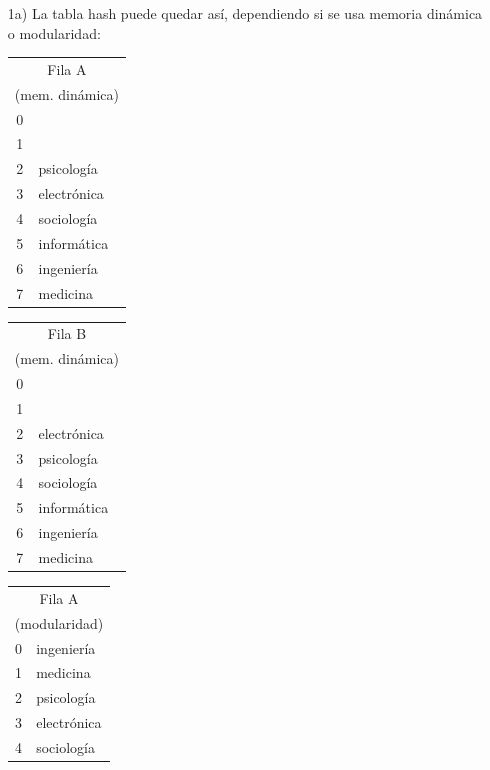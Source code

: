 \documentclass[letter,12pt,oneside]{book}
\theoremstyle{definition}
\begin{document}
\begin{enumerate}
    \item[1a)] La tabla hash puede quedar así, dependiendo si se usa memoria dinámica o modularidad:
    
    \begin{tabular}{|c|l|}
    \multicolumn{2}{c}{Fila A}\\
    \multicolumn{2}{c}{(mem. dinámica)}\\\hline
        0 &  \\\hline
        1 &  \\\hline
        2 & psicología \\\hline
        3 & electrónica\\\hline
        4 & sociología \\\hline
        5 & informática\\\hline
        6 & ingeniería \\\hline
        7 & medicina   \\\hline
    \end{tabular}
    \hspace{2ex}
    \begin{tabular}{|c|l|}
    \multicolumn{2}{c}{Fila B}\\
    \multicolumn{2}{c}{(mem. dinámica)}\\\hline
        0 &  \\\hline
        1 &  \\\hline
        2 & electrónica\\\hline
        3 & psicología \\\hline
        4 & sociología \\\hline
        5 & informática\\\hline
        6 & ingeniería \\\hline
        7 & medicina   \\\hline
    \end{tabular}
    \hspace{2ex}
    \begin{tabular}{|c|l|}
    \multicolumn{2}{c}{Fila A}\\
    \multicolumn{2}{c}{(modularidad)}\\\hline
        0 & ingeniería \\\hline
        1 & medicina   \\\hline
        2 & psicología \\\hline
        3 & electrónica\\\hline
        4 & sociología \\\hline

\end{tabular}
\end{enumerate}
\end{document}
